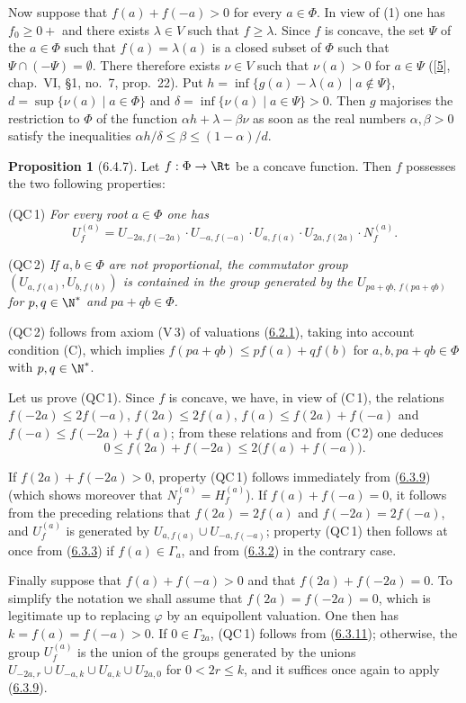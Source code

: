 \documentclass[12pt,a4paper,oneside,english]{smfart}
\makeatletter
\newcommand{\btanchor}[1]{\leavevmode\Hy@raisedlink{\hypertarget{bt:#1}{}}}
\newcommand{\btpageanchor}[1]{\Hy@raisedlink{\hypertarget{p:#1}{}}}
\newcommand{\btref}[1]{\hyperlink{bt:#1}{#1}}
\newcommand{\btbib}[1]{\hyperlink{bib:#1}{#1}}
\newcommand{\btpage}[1]{\marginnote{p.~#1}\btpageanchor{#1}}
\newcommand{\pmark}[1]{\btpage{#1}}
\theoremstyle{definition}
\theoremstyle{bt}
\newtheorem{prop}{Proposition}
\makeatother
\begin{document}
Now suppose that $f(a)+f(-a)>0$ for every $a\in\Phi$. In view of (1) one
has $f_0\geq0+$ and there exists $\lambda\in V$ such that $f\geq\lambda$.
Since $f$ is concave, the set $\Psi$ of the $a\in\Phi$ such that
$f(a)=\lambda(a)$ is a closed subset of $\Phi$ such that
$\Psi\cap(-\Psi)=\emptyset$. There therefore exists $\nu\in V$ such that
$\nu(a)>0$ for $a\in\Psi$ ([\btbib{5}], chap.~VI, \S1, no.~7, prop.~22). Put
$h=\inf\{g(a)-\lambda(a)\mid a\notin\Psi\}$,
$d=\sup\{\nu(a)\mid a\in\Phi\}$ and
$\delta=\inf\{\nu(a)\mid a\in\Psi\}>0$. Then $g$ majorises the restriction
to $\Phi$ of the function $\alpha h+\lambda-\beta\nu$ as soon as the real
numbers $\alpha,\beta>0$ satisfy the inequalities
$\alpha h/\delta\leq\beta\leq(1-\alpha)/d$.

\begin{prop}[6.4.7]\btanchor{6.4.7}
Let $f:\Phi\to\Rt$ be a concave function. Then $f$ possesses the two
following properties:
\smallskip

\noindent\textnormal{(QC\,1)} \emph{For every root $a\in\Phi$ one has}
\[
  U_f^{(a)}=U_{-2a,f(-2a)}\cdot U_{-a,f(-a)}\cdot U_{a,f(a)}\cdot             U_{2a,f(2a)}\cdot N_f^{(a)} .
\]

\noindent\textnormal{(QC\,2)} \emph{If $a,b\in\Phi$ are not proportional,
the commutator group $(U_{a,f(a)},U_{b,f(b)})$ is contained in the group
generated by the $U_{pa+qb,\,f(pa+qb)}$ for $p,q\in\N^{*}$ and
$pa+qb\in\Phi$.}
\end{prop}

(QC\,2) follows from axiom (V\,3) of valuations (\btref{6.2.1}), taking into
account condition (C), which implies $f(pa+qb)\leq pf(a)+qf(b)$ for
$a,b,pa+qb\in\Phi$ with $p,q\in\N^{*}$.

Let us prove (QC\,1). Since $f$ is concave, we have, in view of (C\,1), the
relations $f(-2a)\leq2f(-a)$, $f(2a)\leq2f(a)$, $f(a)\leq f(2a)+f(-a)$ and
$f(-a)\leq f(-2a)+f(a)$; from these relations and from (C\,2) one deduces
\[
  0\leq f(2a)+f(-2a)\leq2\big(f(a)+f(-a)\big).
\]

If $f(2a)+f(-2a)>0$, property (QC\,1) follows immediately from (\btref{6.3.9})
(which shows moreover that $N_f^{(a)}=H_f^{(a)}$). If $f(a)+f(-a)=0$, it
follows from the preceding relations that $f(2a)=2f(a)$ and
$f(-2a)=2f(-a)$, and $U_f^{(a)}$ is generated by
$U_{a,f(a)}\cup U_{-a,f(-a)}$; property (QC\,1) then follows at once from
(\btref{6.3.3}) if $f(a)\in\Gamma_a$, and from (\btref{6.3.2}) in the contrary case.

Finally suppose that $f(a)+f(-a)>0$ and that $f(2a)+f(-2a)=0$. To simplify
the notation we shall assume that $f(2a)=f(-2a)=0$, which is legitimate up
to replacing $\varphi$ by an equipollent valuation. One then has
$k=f(a)=f(-a)>0$. If $0\in\Gamma_{2a}$, (QC\,1) follows from (\btref{6.3.11});
otherwise, the group $U_f^{(a)}$ is the union of the groups generated
\pmark{136}
by the unions $U_{-2a,r}\cup U_{-a,k}\cup U_{a,k}\cup U_{2a,0}$ for
$0<2r\leq k$, and it suffices once again to apply (\btref{6.3.9}).
\end{document}
